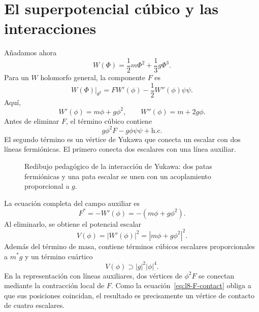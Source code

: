 \section{El superpotencial cúbico y las interacciones}

Añadamos ahora
\begin{equation}
W(\Phi)=\frac12m\Phi^2+\frac13g\Phi^3.
\label{eq:l8-superpotential}
\end{equation}
Para un \(W\) holomorfo general, la componente \(F\) es
\begin{equation}
\left.W(\Phi)\right|_{\theta^2}
=F W'(\phi)-\frac12W''(\phi)\psi\psi.
\label{eq:l8-W-components}
\end{equation}
Aquí,
\begin{equation}
W'(\phi)=m\phi+g\phi^2,
\qquad
W''(\phi)=m+2g\phi.
\end{equation}
Antes de eliminar \(F\), el término cúbico contiene
\begin{equation}
g\phi^2F-g\phi\psi\psi+\text{h.c.}
\label{eq:l8-cubic-offshell}
\end{equation}
El segundo término es un vértice de Yukawa que conecta un escalar con dos líneas fermiónicas. El primero conecta dos escalares con una línea auxiliar.

\begin{figure}[H]
\centering
{}
\caption{Redibujo pedagógico de la interacción de Yukawa: dos patas fermiónicas y una pata escalar se unen con un acoplamiento proporcional a \(g\).}
\end{figure}

La ecuación completa del campo auxiliar es
\begin{equation}
F^\ast=-W'(\phi)=-(m\phi+g\phi^2).
\label{eq:l8-general-F-equation}
\end{equation}
Al eliminarlo, se obtiene el potencial escalar
\begin{equation}
V(\phi)=|W'(\phi)|^2
=|m\phi+g\phi^2|^2.
\label{eq:l8-scalar-potential}
\end{equation}
Además del término de masa, contiene términos cúbicos escalares proporcionales a \(m^\ast g\) y un término cuártico
\begin{equation}
V(\phi)\supset |g|^2|\phi|^4.
\label{eq:l8-quartic}
\end{equation}
En la representación con líneas auxiliares, dos vértices de \(\phi^2F\) se conectan mediante la contracción local de \(F\). Como la ecuación~\eqref{eq:l8-F-contact} obliga a que sus posiciones coincidan, el resultado es precisamente un vértice de contacto de cuatro escalares.

